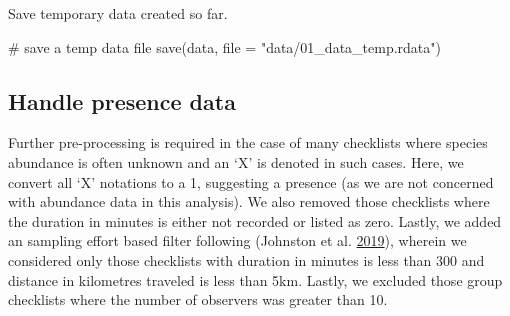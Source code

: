 \documentclass[]{article}
\newenvironment{Shaded}{}{}
\newcommand{\CommentTok}[1]{\textcolor[rgb]{0.00,0.50,0.00}{#1}}
\newcommand{\DataTypeTok}[1]{#1}
\newcommand{\KeywordTok}[1]{\textcolor[rgb]{0.00,0.00,1.00}{#1}}
\newcommand{\NormalTok}[1]{#1}
\newcommand{\StringTok}[1]{\textcolor[rgb]{0.00,0.50,0.50}{#1}}
\begin{document}
Save temporary data created so far.

\begin{Shaded}
\begin{Highlighting}[numbers=left,,]
\CommentTok{# save a temp data file}
\KeywordTok{save}\NormalTok{(data, }\DataTypeTok{file =} \StringTok{"data/01_data_temp.rdata"}\NormalTok{)}
\end{Highlighting}
\end{Shaded}

\hypertarget{handle-presence-data}{%
\subsection{Handle presence data}\label{handle-presence-data}}

Further pre-processing is required in the case of many checklists where species abundance is often unknown and an `X' is denoted in such cases. Here, we convert all `X' notations to a 1, suggesting a presence (as we are not concerned with abundance data in this analysis). We also removed those checklists where the duration in minutes is either not recorded or listed as zero. Lastly, we added an sampling effort based filter following (Johnston et al. \protect\hyperlink{ref-johnston2019a}{2019}), wherein we considered only those checklists with duration in minutes is less than 300 and distance in kilometres traveled is less than 5km. Lastly, we excluded those group checklists where the number of observers was greater than 10.
\end{document}
